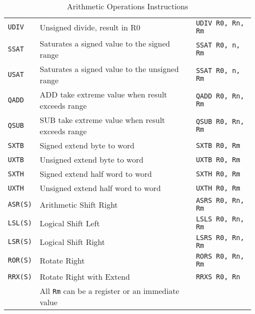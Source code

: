 \documentclass[a4paper,12pt,openany]{book}
\begin{document}
\begin{table}[H]
\begin{tabular}{@{}lll@{}}
        \texttt{UDIV} & Unsigned divide, result in R0 & \texttt{UDIV R0, Rn, Rm} \\
        \texttt{SSAT} & Saturates a signed value to the signed range & \texttt{SSAT R0, n, Rm} \\
        \texttt{USAT} & Saturates a signed value to the unsigned range & \texttt{SSAT R0, n, Rm} \\
        \texttt{QADD} & ADD take extreme value when result exceeds range & \texttt{QADD R0, Rn, Rm} \\
        \texttt{QSUB} & SUB take extreme value when result exceeds range & \texttt{QSUB R0, Rn, Rm} \\
        \texttt{SXTB} & Signed extend byte to word & \texttt{SXTB R0, Rm} \\
        \texttt{UXTB} & Unsigned extend byte to word & \texttt{UXTB R0, Rm} \\
        \texttt{SXTH} & Signed extend half word to word & \texttt{SXTH R0, Rm}\\
        \texttt{UXTH} & Unsigned extend half word to word & \texttt{UXTH R0, Rm}\\
        \texttt{ASR(S)} & Arithmetic Shift Right & \texttt{ASRS R0, Rn, Rm}\\
        \texttt{LSL(S)} & Logical Shift Left & \texttt{LSLS R0, Rn, Rm}\\
        \texttt{LSR(S)} & Logical Shift Right & \texttt{LSRS R0, Rn, Rm}\\
        \texttt{ROR(S)} & Rotate Right & \texttt{RORS R0, Rn, Rm}\\
        \texttt{RRX(S)} & Rotate Right with Extend & \texttt{RRXS R0, Rn}\\
        & All \texttt{Rm} can be a register or an immediate value&\\ 
        \bottomrule
    \end{tabular}
    \label{tab:arithmetic_operations_instructions}
    \caption{Arithmetic Operations Instructions}
\end{table}
\end{document}
